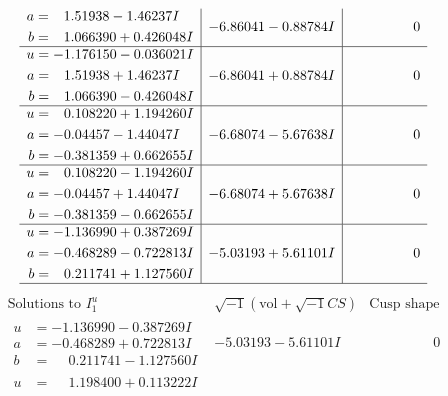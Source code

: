 \documentclass[1p]{elsarticle_modified}
\theoremstyle{definition}
\newcommand{\I}{\sqrt{-1}}
\begin{document}
$$\begin{array}{c|c|c}
\begin{aligned}
a &= \phantom{-}1.51938 - 1.46237 I \\
b &= \phantom{-}1.066390 + 0.426048 I\end{aligned}
 & -6.86041 - 0.88784 I & \phantom{-0.000000 } 0 \\ \hline\begin{aligned}
u &= -1.176150 - 0.036021 I \\
a &= \phantom{-}1.51938 + 1.46237 I \\
b &= \phantom{-}1.066390 - 0.426048 I\end{aligned}
 & -6.86041 + 0.88784 I & \phantom{-0.000000 } 0 \\ \hline\begin{aligned}
u &= \phantom{-}0.108220 + 1.194260 I \\
a &= -0.04457 - 1.44047 I \\
b &= -0.381359 + 0.662655 I\end{aligned}
 & -6.68074 - 5.67638 I & \phantom{-0.000000 } 0 \\ \hline\begin{aligned}
u &= \phantom{-}0.108220 - 1.194260 I \\
a &= -0.04457 + 1.44047 I \\
b &= -0.381359 - 0.662655 I\end{aligned}
 & -6.68074 + 5.67638 I & \phantom{-0.000000 } 0 \\ \hline\begin{aligned}
u &= -1.136990 + 0.387269 I \\
a &= -0.468289 - 0.722813 I \\
b &= \phantom{-}0.211741 + 1.127560 I\end{aligned}
 & -5.03193 + 5.61101 I & \phantom{-0.000000 } 0\\
 \hline 
 \end{array}$$\newpage$$\begin{array}{c|c|c}  
\text{Solutions to }I^u_{1}& \I (\text{vol} + \sqrt{-1}CS) & \text{Cusp shape}\\
 \hline 
\begin{aligned}
u &= -1.136990 - 0.387269 I \\
a &= -0.468289 + 0.722813 I \\
b &= \phantom{-}0.211741 - 1.127560 I\end{aligned}
 & -5.03193 - 5.61101 I & \phantom{-0.000000 } 0 \\ \hline\begin{aligned}
u &= \phantom{-}1.198400 + 0.113222 I \\

\end{aligned}
\end{array}$$
\end{document}
